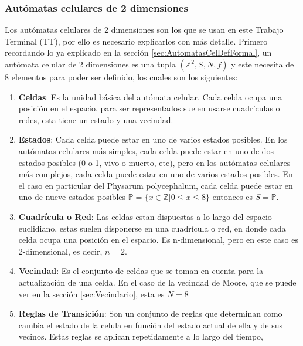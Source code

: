 \subsubsection{Aut\'omatas celulares de 2 dimensiones}
\label{sec:AutomatasCel2D}

    Los aut\'omatas celulares de 2 dimensiones son los que se usan en este Trabajo Terminal (TT), por ello es necesario
        explicarlos con m\'as detalle. Primero recordando lo ya explicado en la secci\'on \ref{sec:AutomatasCelDefFormal}, un aut\'omata
        celular de 2 dimensiones es una tupla $({\mathbb{Z}^{2}},S,N,f)$ y este 
        necesita de 8 elementos para poder ser definido, los cuales son los siguientes:         
    \begin{enumerate}
        \item \textbf{Celdas}: Es la unidad b\'asica del aut\'omata celular. Cada celda ocupa una posici\'on en el espacio, 
            para ser representados suelen usarse cuadr\'iculas o redes, esta tiene un estado y una vecindad.
        \item \textbf{Estados}: Cada celda puede estar en uno de varios estados posibles. En los aut\'omatas celulares
            m\'as simples, cada celda puede estar en uno de dos estados posibles (0 o 1, vivo o muerto, etc), pero en los 
            aut\'omatas celulares m\'as complejos, cada celda puede estar en uno de varios estados posibles. En el caso 
            en particular del Physarum polycephalum, cada celda puede estar en uno de nueve estados posibles 
            $\mathbb{P} = \{x \in \mathbb{Z}| 0 \leq x \leq 8\}$ entonces es $S = \mathbb{P}$.
        \item \textbf{Cuadr\'icula o Red}: Las celdas estan dispuestas a lo largo del espacio euclidiano, estas 
            suelen disponerse en una cuadr\'icula o red, en donde cada celda ocupa una posici\'on en el espacio. Es
            n-dimensional, pero en este caso es 2-dimensional, es decir, $n = 2$.
        \item \textbf{Vecindad}: Es el conjunto de celdas que se toman en cuenta para la actualizaci\'on de una celda. En el caso de
            la vecindad de Moore, que se puede ver en la secci\'on \ref{sec:Vecindario}, esta es $N = 8$
        \item \textbf{Reglas de Transici\'on}: Son un conjunto de reglas que determinan como cambia el estado de la celula en 
            funci\'on del estado actual de ella y de sus vecinos. Estas reglas se aplican repetidamente a lo largo del tiempo,

\end{enumerate}
